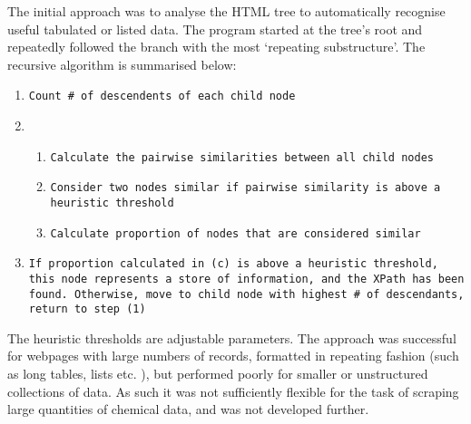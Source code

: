 \label{sec:auto_xpaths}
The initial approach was to analyse the HTML tree to automatically recognise useful tabulated or listed data. The program started at the tree's root and repeatedly followed the branch with the most `repeating substructure'. The recursive algorithm is summarised below:
\begin{sloppypar}
\begin{enumerate}
\item \texttt{Count \# of descendents of each child node}
\item \begin{enumerate}
\item \texttt{Calculate the pairwise similarities between all child nodes}
\item \texttt{Consider  two nodes similar if pairwise similarity is above a heuristic threshold}
\item \texttt{Calculate proportion of nodes that are considered similar}
\end{enumerate}
\item \texttt{If proportion calculated in (c) is above a heuristic threshold, this node represents a store of information, and the XPath has been found. Otherwise, move to child node with highest \# of descendants, return to step (1)}
\end{enumerate}
\end{sloppypar}
The heuristic thresholds are adjustable parameters. The approach was successful for webpages with large numbers of records, formatted in repeating fashion (such as long tables, lists etc. ), but performed poorly for smaller or unstructured collections of data. As such it was not sufficiently flexible for the task of scraping large quantities of chemical data, and was not developed further.